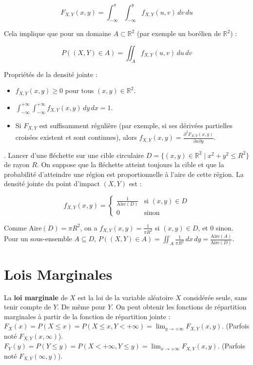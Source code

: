 \[
F_{X,Y}(x,y) = \int_{-\infty}^{x} \int_{-\infty}^{y} f_{X,Y}(u,v) \, dv \, du
\]

Cela implique que pour un domaine $A \subset \mathbb{R}^2$ (par exemple un borélien de $\mathbb{R}^2$) :

\[
P((X,Y) \in A) = \iint_A f_{X,Y}(u,v) \, du \, dv
\]

Propriétés de la densité jointe :
\begin{itemize}
    \item $f_{X,Y}(x,y) \geq 0$ pour tous $(x, y) \in \mathbb{R}^2$.
    \item $\int_{-\infty}^{+\infty} \int_{-\infty}^{+\infty} f_{X,Y}(x,y) \, dy \, dx = 1$.
    \item Si $F_{X,Y}$ est suffisamment régulière (par exemple, si ses dérivées partielles croisées existent et sont continues), alors $f_{X,Y}(x,y) = \frac{\partial^2 F_{X,Y}(x,y)}{\partial x \partial y}$.
\end{itemize}

\begin{exemple}. Lancer d'une fléchette sur une cible circulaire $D = \{(x, y) \in \mathbb{R}^2 \mid x^2 + y^2 \leq R^2\}$ de rayon $R$. On suppose que la fléchette atteint toujours la cible et que la probabilité d'atteindre une région est proportionnelle à l'aire de cette région. La densité jointe du point d'impact $(X, Y)$ est :

\[
f_{X,Y}(x,y) = \begin{cases} 
\frac{1}{\text{Aire}(D)} & \text{si } (x, y) \in D \\ 
0 & \text{sinon} 
\end{cases}
\]

Comme $\text{Aire}(D) = \pi R^2$, on a $f_{X,Y}(x,y) = \frac{1}{\pi R^2}$ si $(x,y) \in D$, et 0 sinon. Pour un sous-ensemble $A \subseteq D$, $P((X, Y) \in A) = \iint_A \frac{1}{\pi R^2} \, dx \, dy = \frac{\text{Aire}(A)}{\text{Aire}(D)}$.

\vspace{2em}
\end{exemple}
\section{Lois Marginales}

La \textbf{loi marginale} de $X$ est la loi de la variable aléatoire $X$ considérée seule, sans tenir compte de $Y$. De même pour $Y$. On peut obtenir les fonctions de répartition marginales à partir de la fonction de répartition jointe : $F_X(x) = P(X \leq x) = P(X \leq x, Y < +\infty) = \lim_{y \to +\infty} F_{X,Y}(x, y)$. (Parfois noté $F_{X,Y}(x, \infty)$). $F_Y(y) = P(Y \leq y) = P(X < +\infty, Y \leq y) = \lim_{x \to +\infty} F_{X,Y}(x, y)$. (Parfois noté $F_{X,Y}(\infty, y)$).

